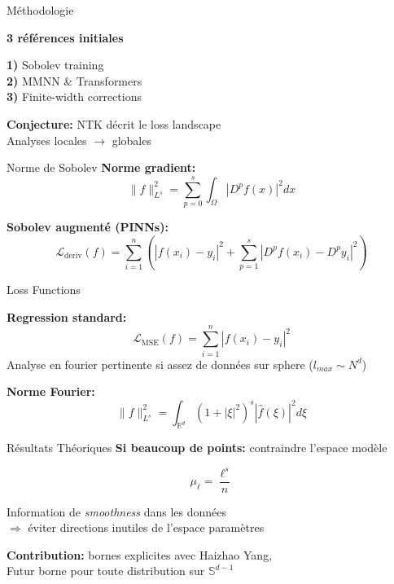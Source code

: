 \documentclass{beamer}
\begin{document}
\begin{frame}{Méthodologie}
\begin{center}
\textbf{3 références initiales}

\vspace{0.5cm}

\textbf{1)} Sobolev training\\
\textbf{2)} MMNN \& Transformers\\
\textbf{3)} Finite-width corrections

\vspace{1cm}

\textbf{Conjecture:} NTK décrit le loss landscape\\
Analyses locales $\rightarrow$ globales
\end{center}
\end{frame}


\begin{frame}{Norme de Sobolev}
\textbf{Norme gradient:}
\begin{equation}
\|f\|_{L^s}^2 = \sum_{p=0}^s \int_{\Omega} |D^p f(x)|^2 dx
\end{equation}


\textbf{Sobolev augmenté (PINNs):}
$$\mathcal{L}_{\text{deriv}}(f) = \sum_{i=1}^{n} \left(|f(x_i) - y_i|^2 + \sum_{p=1}^s |D^p f(x_i) - D^p y_i|^2\right)$$



\end{frame}

\begin{frame}{Loss Functions}


\textbf{Regression standard:}
$$\mathcal{L}_{\text{MSE}}(f) = \sum_{i=1}^{n} |f(x_i) - y_i|^2$$
Analyse en fourier pertinente si assez de données sur sphere ($l_{max} \sim N^d$)

\textbf{Norme Fourier:}
\begin{equation}
\|f\|_{L^s}^2 = \int_{\mathbb{R}^d} (1 + |\xi|^2)^s |\hat{f}(\xi)|^2 d\xi
\end{equation}

\end{frame}



\begin{frame}{Résultats Théoriques}
    \textbf{Si beaucoup de points:} contraindre l'espace modèle
    
    $$\mu_\ell = \frac{\ell^s}{n}$$
    
    \vspace{0.5cm}
    
    Information de \textit{smoothness} dans les données\\
    $\Rightarrow$ éviter directions inutiles de l'espace paramètres
    
    \vspace{0.5cm}
    
    \textbf{Contribution:} bornes explicites avec Haizhao Yang, \\
    Futur borne pour toute distribution sur $\mathbb{S}^{d-1}$
\end{frame}
\end{document}
